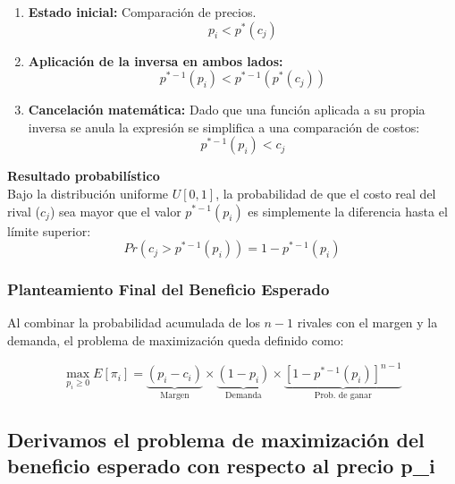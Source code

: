 \documentclass[12pt]{article}
\begin{document}
\begin{enumerate}
    \item \textbf{Estado inicial:} Comparación de precios.
    \begin{equation} p_i < p^*(c_j) \end{equation}
    \item \textbf{Aplicación de la inversa en ambos lados:}
    \begin{equation} p^{*-1}(p_i) < p^{*-1}(p^*(c_j)) \end{equation}
    \item \textbf{Cancelación matemática:} Dado que una función aplicada a su propia inversa se anula la expresión se simplifica a una comparación de costos:
    \begin{equation} p^{*-1}(p_i) < c_j \end{equation}
\end{enumerate}

\noindent \textbf{Resultado probabilístico} \\
Bajo la distribución uniforme $U[0,1]$, la probabilidad de que el costo real del rival ($c_j$) sea mayor que el valor $p^{*-1}(p_i)$ es simplemente la diferencia hasta el límite superior:
\begin{equation}
    Pr(c_j > p^{*-1}(p_i)) = 1 - p^{*-1}(p_i)
\end{equation}

\subsubsection{Planteamiento Final del Beneficio Esperado}
Al combinar la probabilidad acumulada de los $n-1$ rivales con el margen y la demanda, el problema de maximización queda definido como:

\begin{equation}
    \max_{p_{i} \ge 0} E[\pi_i] = \underbrace{(p_{i} - c_{i})}_{\text{Margen}} \times \underbrace{(1 - p_{i})}_{\text{Demanda}} \times \underbrace{[1 - p^{*-1}(p_{i})]^{n-1}}_{\text{Prob. de ganar}}
\end{equation}
\subsection{Derivamos el problema de maximización del beneficio esperado con respecto al precio p_i}
\end{document}
